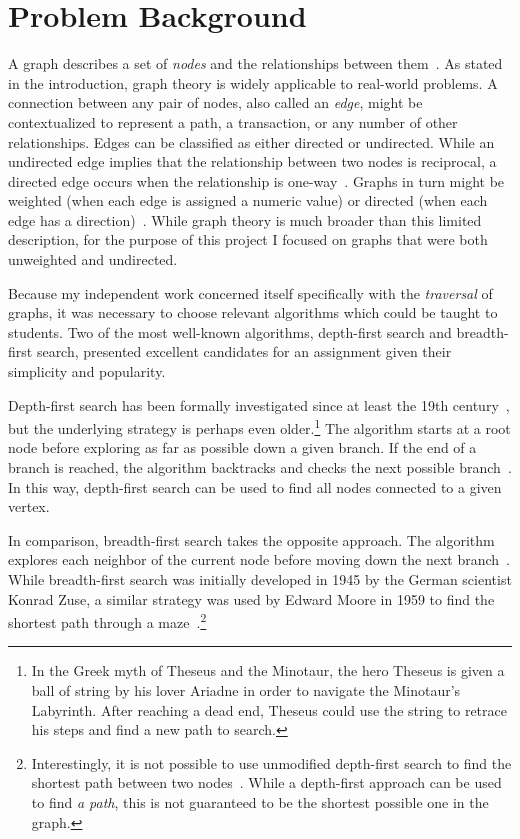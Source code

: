 \documentclass[pageno]{jpaper}
\begin{document}
\section{Problem Background}

A graph describes a set of \emph{nodes} and the relationships between them~\cite{graph}. As stated in the introduction, graph theory is widely applicable to real-world problems. A connection between any pair of nodes, also called an \emph{edge}, might be contextualized to represent a path, a transaction, or any number of other relationships. Edges can be classified as either directed or undirected. While an undirected edge implies that the relationship between two nodes is reciprocal, a directed edge occurs when the relationship is one-way~\cite{graph}. Graphs in turn might be weighted (when each edge is assigned a numeric value) or directed (when each edge has a direction)~\cite{graph}. While graph theory is much broader than this limited description, for the purpose of this project I focused on graphs that were both unweighted and undirected.

Because my independent work concerned itself specifically with the \emph{traversal} of graphs, it was necessary to choose relevant algorithms which could be taught to students. Two of the most well-known algorithms, depth-first search and breadth-first search, presented excellent candidates for an assignment given their simplicity and popularity.

Depth-first search has been formally investigated since at least the 19th century~\cite{dfs}, but the underlying strategy is perhaps even older.\footnote{In the Greek myth of Theseus and the Minotaur, the hero Theseus is given a ball of string by his lover Ariadne in order to navigate the Minotaur's Labyrinth. After reaching a dead end, Theseus could use the string to retrace his steps and find a new path to search.} The algorithm starts at a root node before exploring as far as possible down a given branch. If the end of a branch is reached, the algorithm backtracks and checks the next possible branch~\cite{dfs}. In this way, depth-first search can be used to find all nodes connected to a given vertex.

In comparison, breadth-first search takes the opposite approach. The algorithm explores each neighbor of the current node before moving down the next branch~\cite{bfs}. While breadth-first search was initially developed in 1945 by the German scientist Konrad Zuse, a similar strategy was used by Edward Moore in 1959 to find the shortest path through a maze~\cite{bfs}.\footnote{Interestingly, it is not possible to use unmodified depth-first search to find the shortest path between two nodes~\cite{suboptimal}. While a depth-first approach can be used to find \emph{a path}, this is not guaranteed to be the shortest possible one in the graph.}
\end{document}
